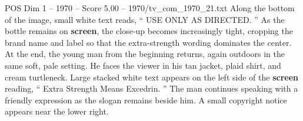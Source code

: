 \begin{textsample}{POS Dim 1 – 1970 – Score 5.00 – 1970/tv\_com\_1970\_21.txt}
Along the bottom of the image, small white text reads, “ USE ONLY AS DIRECTED. ” As the bottle remains on \textbf{screen}, the close-up becomes increasingly tight, cropping the brand name and label so that the extra-strength wording dominates the center.
At the end, the young man from the beginning returns, again outdoors in the same soft, pale setting.
He faces the viewer in his tan jacket, plaid shirt, and cream turtleneck.
Large stacked white text appears on the left side of the \textbf{screen} reading, “ Extra Strength Means Excedrin. ” The man continues speaking with a friendly expression as the slogan remains beside him.
A small copyright notice appears near the lower right.

\end{textsample}
